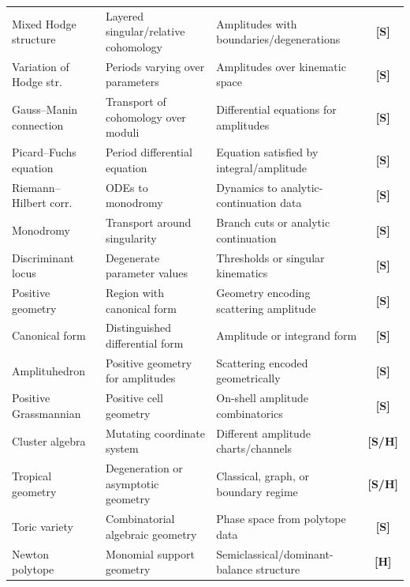 \documentclass[12pt]{article}
\theoremstyle{definition}
\theoremstyle{remark}
\newcommand{\status}[1]{\textnormal{\textsf{\textbf{[#1]}}}}
\begin{document}
\begin{center}
\begin{longtable}{P{3.6cm} P{4.1cm} P{4.1cm} c}
Mixed Hodge structure & Layered singular/relative cohomology & Amplitudes with boundaries/degenerations & \status{S} \\
Variation of Hodge str. & Periods varying over parameters & Amplitudes over kinematic space & \status{S} \\
Gauss--Manin connection & Transport of cohomology over moduli & Differential equations for amplitudes & \status{S} \\
Picard--Fuchs equation & Period differential equation & Equation satisfied by integral/amplitude & \status{S} \\
Riemann--Hilbert corr. & ODEs to monodromy & Dynamics to analytic-continuation data & \status{S} \\
Monodromy & Transport around singularity & Branch cuts or analytic continuation & \status{S} \\
Discriminant locus & Degenerate parameter values & Thresholds or singular kinematics & \status{S} \\
Positive geometry & Region with canonical form & Geometry encoding scattering amplitude & \status{S} \\
Canonical form & Distinguished differential form & Amplitude or integrand form & \status{S} \\
Amplituhedron & Positive geometry for amplitudes & Scattering encoded geometrically & \status{S} \\
Positive Grassmannian & Positive cell geometry & On-shell amplitude combinatorics & \status{S} \\
Cluster algebra & Mutating coordinate system & Different amplitude charts/channels & \status{S/H} \\
Tropical geometry & Degeneration or asymptotic geometry & Classical, graph, or boundary regime & \status{S/H} \\
Toric variety & Combinatorial algebraic geometry & Phase space from polytope data & \status{S} \\
Newton polytope & Monomial support geometry & Semiclassical/dominant-balance structure & \status{H} \\
\end{longtable}
\end{center}
\end{document}
